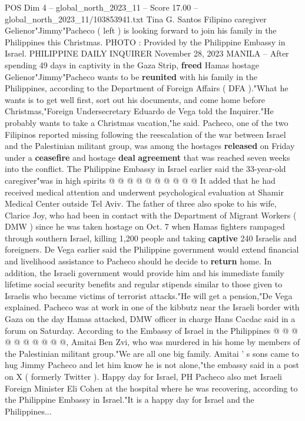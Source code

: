 \begin{textsample}{POS Dim 4 – global\_north\_2023\_11 – Score 17.00 – global\_north\_2023\_11/103853941.txt}  \label{ex:f4_pos_210}
Tina G.
Santos Filipino caregiver Gelienor"Jimmy"Pacheco ( left ) is looking forward to join his family in the Philippines this Christmas.
PHOTO : Provided by the Philippine Embassy in Israel.
PHILIPPINE DAILY INQUIRER November 28, 2023 MANILA -- After spending 49 days in captivity in the Gaza Strip, \textbf{freed} Hamas hostage Gelienor"Jimmy"Pacheco wants to be \textbf{reunited} with his family in the Philippines, according to the Department of Foreign Affairs ( DFA )."What he wants is to get well first, sort out his documents, and come home before Christmas,"Foreign Undersecretary Eduardo de Vega told the Inquirer."He probably wants to take a Christmas vacation,"he said.
Pacheco, one of the two Filipinos reported missing following the reescalation of the war between Israel and the Palestinian militant group, was among the hostages \textbf{released} on Friday under a \textbf{ceasefire} and hostage \textbf{deal} \textbf{agreement} that was reached seven weeks into the conflict.
The Philippine Embassy in Israel earlier said the 33-year-old caregiver"was in high spirits @ @ @ @ @ @ @ @ @ @ It added that he had received medical attention and underwent psychological evaluation at Shamir Medical Center outside Tel Aviv.
The father of three also spoke to his wife, Clarice Joy, who had been in contact with the Department of Migrant Workers ( DMW ) since he was taken hostage on Oct. 7 when Hamas fighters rampaged through southern Israel, killing 1,200 people and taking \textbf{captive} 240 Israelis and foreigners.
De Vega earlier said the Philippine government would extend financial and livelihood assistance to Pacheco should he decide to \textbf{return} home.
In addition, the Israeli government would provide him and his immediate family lifetime social security benefits and regular stipends similar to those given to Israelis who became victims of terrorist attacks."He will get a pension,"De Vega explained.
Pacheco was at work in one of the kibbutz near the Israeli border with Gaza on the day Hamas attacked, DMW officer in charge Hans Cacdac said in a forum on Saturday.
According to the Embassy of Israel in the Philippines @ @ @ @ @ @ @ @ @ @, Amitai Ben Zvi, who was murdered in his home by members of the Palestinian militant group."We are all one big family.
Amitai ' s sons came to hug Jimmy Pacheco and let him know he is not alone,"the embassy said in a post on X ( formerly Twitter ).
Happy day for Israel, PH Pacheco also met Israeli Foreign Minister Eli Cohen at the hospital where he was recovering, according to the Philippine Embassy in Israel."It is a happy day for Israel and the Philippines...

\end{textsample}
